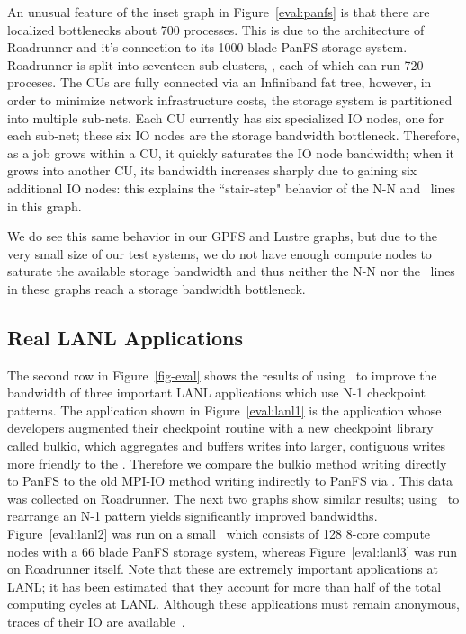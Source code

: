 An unusual feature of the inset graph in Figure~\ref{eval:panfs} is that there
are localized bottlenecks about 700 processes.  This is due to the architecture
of Roadrunner and it's connection to its 1000 blade PanFS storage system.
Roadrunner is split into seventeen sub-clusters, , each of which can
run 720 proceses.  The CUs are fully connected via an Infiniband fat tree,
however, in order to minimize network infrastructure costs, the storage system
is partitioned into multiple sub-nets. Each CU currently has six specialized IO
nodes, one for each sub-net; these six IO nodes are the storage bandwidth
bottleneck.  Therefore, as a job grows within a CU, it quickly saturates the IO
node bandwidth; when it grows into another CU, its bandwidth increases sharply
due to gaining six additional IO nodes: this explains the ``stair-step"
behavior of the N-N and \plfs\ lines in this graph. 
 
We do see this same behavior in our GPFS and Lustre graphs, but due to the
very small size of our test systems, we do not have enough compute nodes to
saturate the available storage bandwidth and thus neither the N-N nor the
\plfs\ lines in these graphs reach a storage bandwidth bottleneck. 

\subsection{Real LANL Applications}

The second row in Figure~\ref{fig-eval} shows the results of using \plfs\ to
improve the bandwidth of three important LANL applications which use N-1
checkpoint patterns. The application shown in Figure~\ref{eval:lanl1} is the
application whose developers augmented their checkpoint routine with a new
checkpoint library called bulkio, which aggregates and buffers writes into
larger, contiguous writes more friendly to the \upfs. Therefore we compare the
bulkio method writing directly to PanFS to the old MPI-IO method writing
indirectly to PanFS via \plfs.  This data was collected on Roadrunner.  The
next two graphs show similar results; using \plfs\ to rearrange an N-1 pattern
yields significantly improved bandwidths.  Figure~\ref{eval:lanl2} was run on a
small \rrz\ which consists of 128 8-core compute nodes with a 66 blade PanFS
storage system, whereas Figure~\ref{eval:lanl3} was run on Roadrunner itself.
Note that these are extremely important applications at LANL; it has been
estimated that they account for more than half of the total computing cycles at
LANL.  Although these applications must remain anonymous, traces of their IO
are available~\cite{plfs-maps}.

